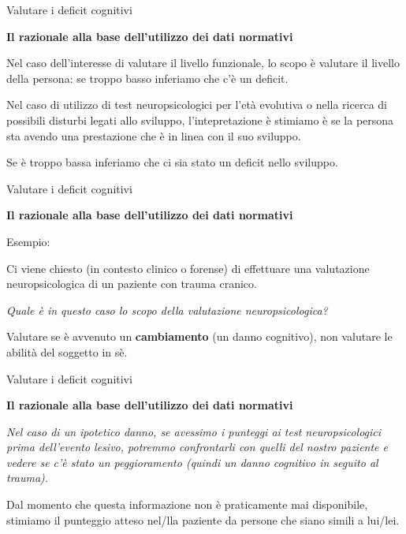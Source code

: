 \documentclass[
  ignorenonframetext,
]{beamer}
\begin{document}
\begin{frame}{Valutare i deficit cognitivi}
\label{valutare-i-deficit-cognitivi-10}
\begin{center}
  \textbf{Il razionale alla base dell’utilizzo dei dati normativi}
\end{center}

Nel caso dell'interesse di valutare il livello funzionale, lo scopo è
valutare il livello della persona: se troppo basso inferiamo che c'è un
deficit.

Nel caso di utilizzo di test neuropsicologici per l'età evolutiva o
nella ricerca di possibili disturbi legati allo sviluppo,
l'intepretazione è stimiamo è se la persona sta avendo una prestazione
che è in linea con il suo sviluppo.

Se è troppo bassa inferiamo che ci sia stato un deficit nello sviluppo.
\end{frame}

\begin{frame}{Valutare i deficit cognitivi}
\label{valutare-i-deficit-cognitivi-11}
\begin{center}
  \textbf{Il razionale alla base dell’utilizzo dei dati normativi}
\end{center}

Esempio:

Ci viene chiesto (in contesto clinico o forense) di effettuare una
valutazione neuropsicologica di un paziente con trauma cranico.

\emph{Quale è in questo caso lo scopo della valutazione
neuropsicologica?}

Valutare se è avvenuto un \textbf{cambiamento} (un danno cognitivo), non
valutare le abilità del soggetto in sè.
\end{frame}

\begin{frame}{Valutare i deficit cognitivi}
\label{valutare-i-deficit-cognitivi-12}
\begin{center}
  \textbf{Il razionale alla base dell’utilizzo dei dati normativi}
\end{center}

\emph{Nel caso di un ipotetico danno, se avessimo i punteggi ai test
neuropsicologici prima dell'evento lesivo, potremmo confrontarli con
quelli del nostro paziente e vedere se c'è stato un peggioramento
(quindi un danno cognitivo in seguito al trauma).}

Dal momento che questa informazione non è praticamente mai disponibile,
stimiamo il punteggio atteso nel/lla paziente da persone che siano
simili a lui/lei.
\end{frame}
\end{document}
